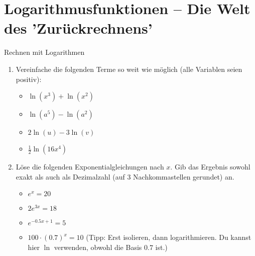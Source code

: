 \section{Logarithmusfunktionen – Die Welt des 'Zurückrechnens'}
\label{sec:logarithmusfunktionen_intro}

\begin{aufgabenumgebung}{Rechnen mit Logarithmen}
\begin{enumerate}
    \item Vereinfache die folgenden Terme so weit wie möglich (alle Variablen seien positiv):
        \begin{itemize}
            \item $\ln(x^3) + \ln(x^2)$
            \item $\ln(a^5) - \ln(a^2)$
            \item $2\ln(u) - 3\ln(v)$
            \item $\frac{1}{2}\ln(16x^4)$
        \end{itemize}
    \item Löse die folgenden Exponentialgleichungen nach $x$. Gib das Ergebnis sowohl exakt als auch als Dezimalzahl (auf 3 Nachkommastellen gerundet) an.
        \begin{itemize}
            \item $e^x = 20$
            \item $2e^{3x} = 18$
            \item $e^{-0.5x+1} = 5$
            \item $100 \cdot (0.7)^x = 10$ (Tipp: Erst isolieren, dann logarithmieren. Du kannst hier $\ln$ verwenden, obwohl die Basis $0.7$ ist.)
        \end{itemize}
\end{enumerate}
\end{aufgabenumgebung}




